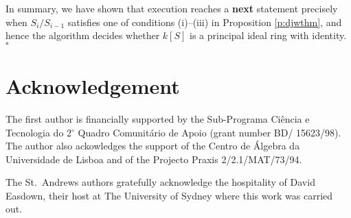 \documentclass{acmconf}
\begin{document}
In summary, we have shown that execution reaches a {\bf next} statement
precisely when $S_i/S_{i-1}$ satisfies one of conditions (i)--(iii) 
in Proposition \ref{p:djwthm}, and hence the algorithm decides
whether $k[S]$ is a principal ideal ring with identity.  $\square$




\section*{Acknowledgement}
The first author is financially supported by the
Sub-Programa Ci\^encia e Tecnologia do 2$^{\circ}$ 
Quadro Comunit\'ario de Apoio (grant number BD/ 15623/98). 
The author also ackowledges the support of
the Centro de \'Algebra da Universidade de Lisboa and of the Projecto
Praxis 2/2.1/MAT/73/94.

The St.~Andrews authors gratefully acknowledge the 
hospitality of David Easdown, their host at The  University of Sydney
where this work was carried out.
\end{document}
